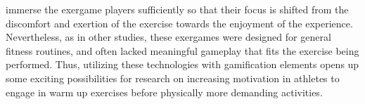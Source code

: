 immerse the exergame players sufficiently so that their focus is shifted from the discomfort and exertion of the exercise towards the enjoyment of the experience. Nevertheless, as in other studies, these exergames were designed for general fitness routines, and often lacked meaningful gameplay that fits the exercise being performed.  Thus, utilizing these technologies with gamification elements opens up some exciting possibilities for research on increasing motivation in athletes to  engage in warm up exercises before physically more demanding activities. 
